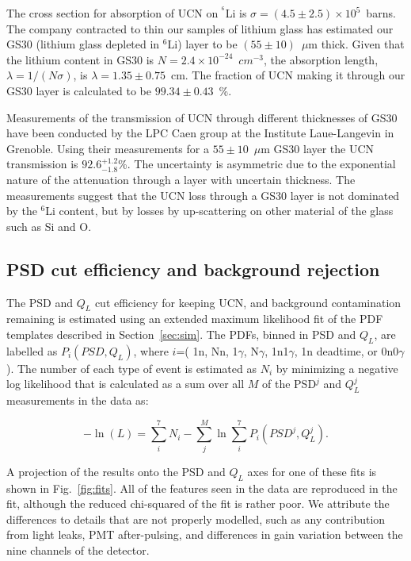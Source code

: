 \documentclass[letter,twocolumn,preprint,3p,numbers,sort&compress]{elsarticle}
\begin{document}
The cross section for absorption of UCN on $^{^6}$Li is $\sigma =
(4.5\pm2.5)\times10^{5}$~barns\cite{ban}.  The company contracted to
thin our samples of lithium glass has estimated our GS30 (lithium
glass depleted in $^6$Li) layer to be $(55\pm10)$~$\mu$m thick.  Given
that the lithium content in GS30 is $N = 2.4\times10^{-24}$~$cm^{-3}$,
the absorption length, $\lambda=1/(N\sigma)$, is
$\lambda=1.35\pm0.75$~cm.  The fraction of UCN making it through our
GS30 layer is calculated to be $99.34\pm0.43$~\%.

Measurements of the transmission of UCN through different thicknesses
of GS30 have been conducted by the LPC Caen group at the Institute
Laue-Langevin in Grenoble\cite{Senoville}.  Using their measurements
for a $55\pm10$~$\mu$m GS30 layer the UCN transmission is
$92.6^{+1.2}_{-1.8}$\%. The uncertainty is asymmetric due to the
exponential nature of the attenuation through a layer with uncertain
thickness.  The measurements suggest that the UCN loss through a GS30
layer is not dominated by the $^{6}$Li content, but by losses by
up-scattering on other material of the glass such as Si and O.

\subsection{ PSD cut efficiency and background rejection}\label{sec:bgreject}

The PSD and $Q_L$ cut efficiency for keeping UCN, and background
contamination remaining is estimated using an extended maximum
likelihood fit of the PDF templates described in
Section~\ref{sec:sim}.  The PDFs, binned in PSD and $Q_L$, are
labelled as $P_{i}( PSD, Q_L )$, where $i$=( 1n, Nn, 1$\gamma$,
N$\gamma$, 1n1$\gamma$, 1n deadtime, or 0n0$\gamma$).  The number of
each type of event is estimated as $N_i$ by minimizing a negative log
likelihood that is calculated as a sum over all $M$ of the PSD$^j$ and
$Q_L^j$ measurements in the data as:

\begin{equation}
-\ln{(L)} = \sum_{i}^{7} N_i - \sum_{j}^{M} \ln{ \sum_{i}^{7} P_i( PSD^j, Q_L^j) }.
\end{equation}

A projection of the results onto the PSD and $Q_L$ axes for one of
these fits is shown in Fig.~\ref{fig:fits}.  All of the features seen
in the data are reproduced in the fit, although the reduced
chi-squared of the fit is rather poor.  We attribute the differences
to details that are not properly modelled, such as any contribution
from light leaks, PMT after-pulsing, and differences in gain variation
between the nine channels of the detector.
\end{document}
